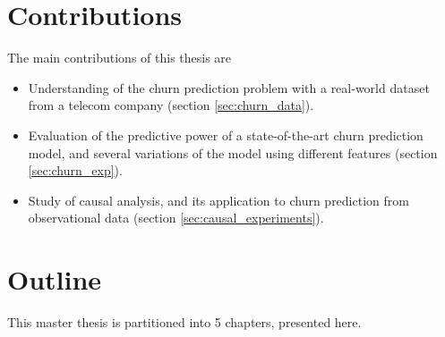\section{Contributions}
The main contributions of this thesis are
\begin{itemize}
    \item Understanding of the churn prediction problem with a real-world
    dataset from a telecom company (section \ref{sec:churn_data}).
    \item Evaluation of the predictive power of a state-of-the-art churn
    prediction model, and several variations of the model using different
    features (section \ref{sec:churn_exp}).
    \item Study of causal analysis, and its application to churn prediction from
    observational data (section \ref{sec:causal_experiments}).
\end{itemize}

\section{Outline}

This master thesis is partitioned into 5 chapters, presented here.

